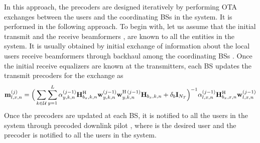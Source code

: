 In this approach, the precoders are designed iteratively by performing \ac{OTA} exchanges between the users and the coordinating \acp{BS} in the system. It is performed in the following approach. To begin with, let us assume that the initial transmit and the receive beamformers ,  are known to all the entities in the system. It is usually obtained by initial exchange of information about the local users receive beamformers through backhaul among the coordinating \acp{BS} . Once the initial receive equalizers are known at the transmitters, each \ac{BS} updates the transmit precoders for the  exchange as
\begin{equation}
\mathbf{m}_{l,x,n}^{(j)} = \Big ( \sum_{k \in \mathcal{U}} \sum_{y=1}^L \alpha_{y,k,n}^{(j-1)} \mathbf{H}_{b_x,k,n}^{\mathrm{H}} \mathbf{w}_{y,k,n}^{(j-1)} \mathbf{w}_{y,k,n}^{\mathrm{H} \, {(j-1)}} \mathbf{H}_{b_x,k,n} + \delta_b \mathbf{I}_{N_T} \Big )^{-1} \alpha^{(j-1)}_{l,x,n} \mathbf{H}_{b_x,x,n}^{\mathrm{H}} \mathbf{w}_{l,x,n}^{(j-1)}
\end{equation}
Once the precoders are updated at each \ac{BS}, it is notified to all the users in the system through precoded downlink pilot , where  is the desired user and the precoder  is notified to all the users in the system. 

